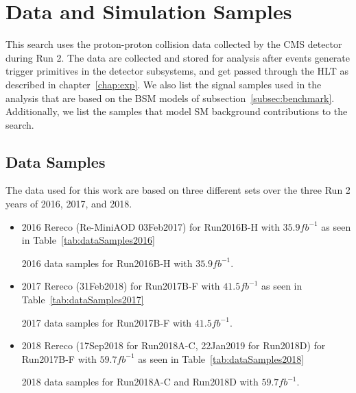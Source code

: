 \section{Data and Simulation Samples}
\label{sec:samples}

This search uses the proton-proton collision data collected by the CMS detector during Run 2.
The data are collected and stored for analysis after events generate trigger primitives in the detector subsystems, and get passed through the HLT as described in chapter~\ref{chap:exp}.
We also list the signal samples used in the analysis that are based on the BSM models of subsection~\ref{subsec:benchmark}.
Additionally, we list the samples that model SM background contributions to the search.

\subsection{Data Samples}

The data used for this work are based on three different sets over the three Run 2 years of 2016, 2017, and 2018.
\begin{itemize}
  \item 2016 Rereco (Re-MiniAOD 03Feb2017) for Run2016B-H with $35.9\unit{fb^{-1}}$ as seen in Table~\ref{tab:dataSamples2016}
  \begin{table}[htbp]
    \centering
    
    \caption{
      2016 data samples for Run2016B-H with $35.9\unit{fb^{-1}}$.
    }
    \label{tab:dataSamples2016}
  \end{table}
  \item 2017 Rereco (31Feb2018) for Run2017B-F with $41.5\unit{fb^{-1}}$ as seen in Table~\ref{tab:dataSamples2017}
  \begin{table}[htbp]
    \centering
    
    \caption{
      2017 data samples for Run2017B-F with $41.5\unit{fb^{-1}}$.
    }
    \label{tab:dataSamples2017}
  \end{table}
  \item 2018 Rereco (17Sep2018 for Run2018A-C, 22Jan2019 for Run2018D) for Run2017B-F with $59.7\unit{fb^{-1}}$ as seen in Table~\ref{tab:dataSamples2018}
  \begin{table}[htbp]
    \centering
    
    \caption{
      2018 data samples for Run2018A-C and Run2018D with $59.7\unit{fb^{-1}}$.
    }
    \label{tab:dataSamples2018}
  \end{table}
\end{itemize}

